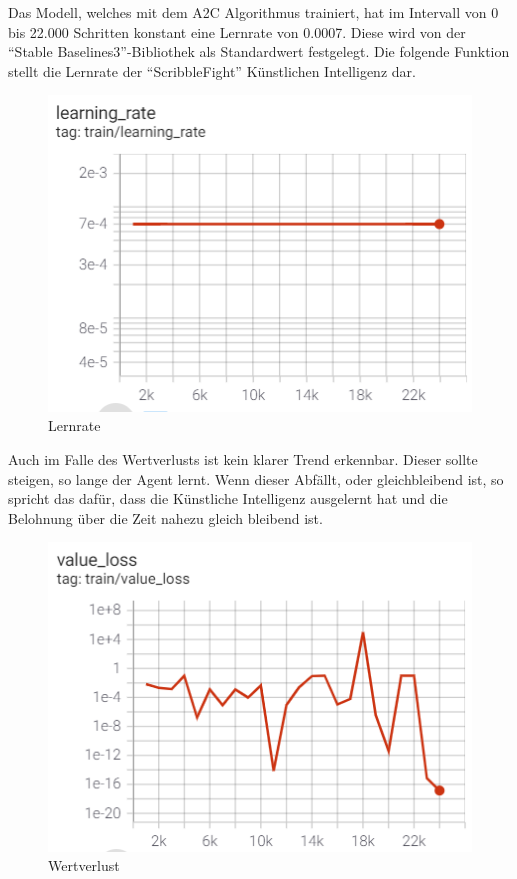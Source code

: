 Das Modell, welches mit dem A2C Algorithmus trainiert, hat im Intervall von 0 bis 22.000 Schritten
konstant eine Lernrate von 0.0007. Diese wird von der ``Stable Baselines3''-Bibliothek als Standardwert
festgelegt.
Die folgende Funktion stellt die Lernrate der ``ScribbleFight'' Künstlichen Intelligenz dar.

\begin{figure}[H]
    \centering
    \includegraphics[scale=0.7]{pics/Tensorboard/A2C/learning_rate.png}
    \caption{Lernrate}
    \label{fig:a2c:learningrate}
\end{figure}

Auch im Falle des Wertverlusts ist kein klarer Trend erkennbar.
Dieser sollte steigen, so lange der Agent lernt. Wenn dieser Abfällt, oder gleichbleibend ist,
so spricht das dafür, dass die Künstliche Intelligenz ausgelernt hat und die Belohnung über die Zeit
nahezu gleich bleibend ist.

\begin{figure}[H]
    \centering
    \includegraphics[scale=0.7]{pics/Tensorboard/A2C/value_loss_new.png}
    \caption{Wertverlust}
    \label{fig:a2c:valueLoss}
\end{figure}

